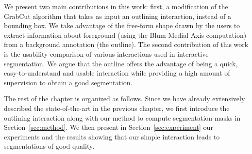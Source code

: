 We present two main contributions in this work:
first, a modification of the GrabCut algorithm
that takes as input an outlining interaction, instead of a bounding box.
We take advantage of the free-form shape drawn by the users
to extract information about foreground
(using the Blum Medial Axis computation)
from a background annotation (the outline).
The second contribution of this work is the usability comparison
of various interactions used in interactive segmentation.
We argue that the outline offers the advantage of being a quick,
easy-to-understand and usable interaction while providing
a high amount of supervision to obtain a good segmentation.


The rest of the chapter is organized as follows. Since we have already
extensively described the state-of-the-art in the previous chapter,
we first introduce the outlining interaction along with our method
to compute segmentation masks in Section~\ref{sec:method}.
We then present in Section~\ref{sec:experiment} our experiments and the results
showing that our simple interaction leads to segmentations of good quality.












